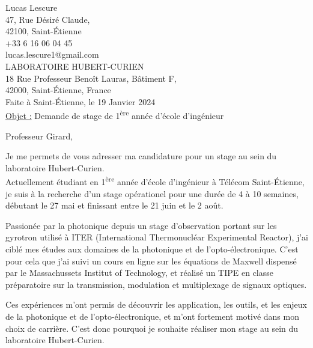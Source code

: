 \documentclass[11pt]{article}
\begin{document}
\thispagestyle{empty}
Lucas Lescure\\
47, Rue Désiré Claude,\\
42100, Saint-Étienne\\
+33 6 16 06 04 45\\
lucas.lescure1@gmail.com\\

\hfill LABORATOIRE HUBERT-CURIEN\\

\hfill  18 Rue Professeur Benoît Lauras, Bâtiment F,\\
\vspace{1pt}
\hfill 42000, Saint-Étienne, France\\

\vspace{0.1cm}
\hfill Faite à Saint-Étienne, le 19 Janvier 2024\\


\underline{Objet :} Demande de stage de 1\textsuperscript{ère} année d'école d'ingénieur

\vspace{0.5cm}

Professeur Girard,

\vspace{0.5cm}
Je me permets de vous adresser ma candidature pour un stage au sein du laboratoire Hubert-Curien.\\
Actuellement étudiant en 1\textsuperscript{ère} année d'école d'ingénieur à Télécom Saint-Étienne, je suis à la recherche d'un stage opérationel pour une durée de 4 à 10 semaines, débutant le 27 mai et finissant entre le 21 juin et le  2 août.

\vspace{0.5cm}
Passionée par la photonique depuis un stage d'observation portant sur les gyrotron utilisé à ITER (International Thermonucléar Experimental Reactor), j'ai ciblé mes études aux domaines de la photonique et de l'opto-électronique. C'est pour cela que j'ai suivi un cours en ligne sur les équations de Maxwell dispensé par le Massachussets Institut of Technology, et réalisé un TIPE en classe préparatoire sur la transmission, modulation et multiplexage de signaux optiques.

\vspace{0.5cm}
Ces expériences m'ont permis de découvrir les application, les outils, et les enjeux de la photonique et de l'opto-électronique, et m'ont fortement motivé dans mon choix de carrière. C'est donc pourquoi je souhaite réaliser mon stage au sein du laboratoire Hubert-Curien.
\end{document}
